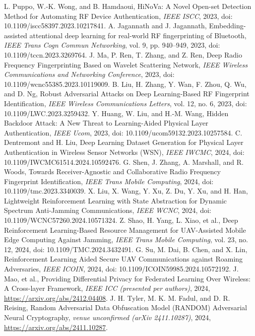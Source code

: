 L. Puppo, W.-K. Wong, and B. Hamdaoui, HiNoVa: A Novel Open-set Detection Method for Automating RF Device Authentication, \emph{IEEE ISCC}, 2023, doi: 10.1109/iscc58397.2023.10217841.
A. Jagannath and J. Jagannath, Embedding-assisted attentional deep learning for real-world RF fingerprinting of Bluetooth, \emph{IEEE Trans Cogn Commun Networking}, vol. 9, pp. 940--949, 2023, doi: 10.1109/tccn.2023.3269764.
J. Ma, P. Ren, T. Zhang, and Z. Ren, Deep Radio Frequency Fingerprinting Based on Wavelet Scattering Network, \emph{IEEE Wireless Communications and Networking Conference}, 2023, doi: 10.1109/wcnc55385.2023.10119009.
B. Liu, H. Zhang, Y. Wan, F. Zhou, Q. Wu, and D. Ng, Robust Adversarial Attacks on Deep Learning-Based RF Fingerprint Identification, \emph{IEEE Wireless Communications Letters}, vol. 12, no. 6, 2023, doi: 10.1109/LWC.2023.3259432.
Y. Huang, W. Liu, and H.-M. Wang, Hidden Backdoor Attack: A New Threat to Learning-Aided Physical Layer Authentication, \emph{IEEE Ucom}, 2023, doi: 10.1109/ucom59132.2023.10257584.
C. Dentremont and H. Liu, Deep Learning Dataset Generation for Physical Layer Authentication in Wireless Sensor Networks (WSN), \emph{IEEE IWCMC}, 2024, doi: 10.1109/IWCMC61514.2024.10592476.
G. Shen, J. Zhang, A. Marshall, and R. Woods, Towards Receiver-Agnostic and Collaborative Radio Frequency Fingerprint Identification, \emph{IEEE Trans Mobile Computing}, 2024, doi: 10.1109/tmc.2023.3340039.
X. Liu, X. Wang, Y. Xu, Z. Du, Y. Xu, and H. Han, Lightweight Reinforcement Learning with State Abstraction for Dynamic Spectrum Anti-Jamming Communications, \emph{IEEE WCNC}, 2024, doi: 10.1109/WCNC57260.2024.10571324.
Z. Shao, H. Yang, L. Xiao, et al., Deep Reinforcement Learning-Based Resource Management for UAV-Assisted Mobile Edge Computing Against Jamming, \emph{IEEE Trans Mobile Computing}, vol. 23, no. 12, 2024, doi: 10.1109/TMC.2024.3432491.
G. Su, M. Dai, B. Chen, and X. Lin, Reinforcement Learning Aided Secure UAV Communications against Roaming Adversaries, \emph{IEEE ICOIN}, 2024, doi: 10.1109/ICOIN59985.2024.10572192.
J. Mao, et al., Providing Differential Privacy for Federated Learning Over Wireless: A Cross-layer Framework, \emph{IEEE ICC (presented per authors)}, 2024, \url{https://arxiv.org/abs/2412.04408}.
J. H. Tyler, M. K. M. Fadul, and D. R. Reising, Random Adversarial Data Obfuscation Model (RANDOM) Adversarial Neural Cryptography, \emph{venue unconfirmed (arXiv 2411.10287)}, 2024, \url{https://arxiv.org/abs/2411.10287}.
